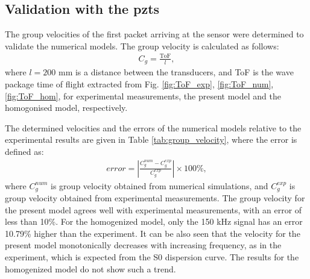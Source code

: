 \subsection{Validation with the \acp{pzt}}
The group velocities of the first packet arriving at the sensor were determined to validate the numerical models.  
The group velocity is calculated as follows:
\begin{eqnarray}
	C_g = \frac{\mathrm{ToF}}{l},
\end{eqnarray}
where \(l=200\) mm is a distance between the transducers, and ToF is the wave package time of flight extracted from Fig. \ref{fig:ToF_exp}, \ref{fig:ToF_num}, \ref{fig:ToF_hom}, for experimental measurements, the present model and the homogonised model, respectively.

The determined velocities and the errors of the numerical models relative to the experimental results are given in Table \ref{tab:group_velocity}, where the error is defined as:
\begin{eqnarray}
	error = \left|\frac{C_g^{num}-C_g^{exp}}{C_g^{exp}}\right|\times100\%,
\end{eqnarray}
where \(C_g^{num}\) is group velocity obtained from numerical simulations, and \(C_g^{exp}\) is group velocity obtained from experimental measurements.
The group velocity for the present model agrees well with experimental measurements, with an error of less than 10\%.
For the homogenized model, only the 150 kHz signal has an error 10.79\% higher than the experiment.
It can be also seen that the velocity for the present model monotonically decreases with increasing frequency, as in the experiment, which is expected from the S0 dispersion curve.
The results for the homogenized model do not show such a trend.

